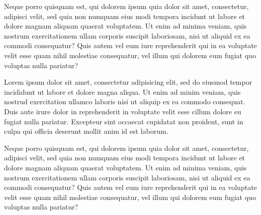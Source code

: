 Neque porro quisquam est, qui dolorem ipsum quia dolor sit amet, consectetur, 
adipisci velit, sed quia non numquam eius modi tempora incidunt ut labore et 
dolore magnam aliquam quaerat voluptatem. Ut enim ad minima veniam, quis 
nostrum exercitationem ullam corporis suscipit laboriosam, nisi ut aliquid 
ex ea commodi consequatur? Quis autem vel eum iure reprehenderit qui in ea 
voluptate velit esse quam nihil molestiae consequatur, vel illum qui dolorem 
eum fugiat quo voluptas nulla pariatur?

Lorem ipsum dolor sit amet, consectetur adipisicing elit, sed do eiusmod
tempor incididunt ut labore et dolore magna aliqua. Ut enim ad minim veniam,
quis nostrud exercitation ullamco laboris nisi ut aliquip ex ea commodo
consequat. Duis aute irure dolor in reprehenderit in voluptate velit esse
cillum dolore eu fugiat nulla pariatur. Excepteur sint occaecat cupidatat
non proident, sunt in culpa qui officia deserunt mollit anim id est laborum.

Neque porro quisquam est, qui dolorem ipsum quia dolor sit amet, consectetur, 
adipisci velit, sed quia non numquam eius modi tempora incidunt ut labore et 
dolore magnam aliquam quaerat voluptatem. Ut enim ad minima veniam, quis 
nostrum exercitationem ullam corporis suscipit laboriosam, nisi ut aliquid 
ex ea commodi consequatur? Quis autem vel eum iure reprehenderit qui in ea 
voluptate velit esse quam nihil molestiae consequatur, vel illum qui dolorem 
eum fugiat quo voluptas nulla pariatur?
